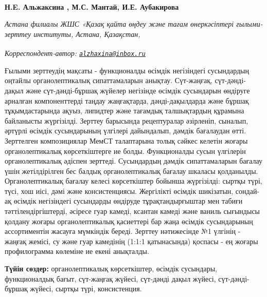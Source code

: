 
\begin{articleheader}

{\bfseries Н.E. Альжаксина\textsuperscript{\envelope } ,
М.С. Мантай,
И.Е. Аубакирова}
\end{articleheader}

\begin{affiliation}
\emph{Астана филиалы ЖШС «Қазақ қайта өңдеу және тағам өнеркәсіптері ғылыми-зерттеу институты, Астана, Қазақстан,}

\raggedright \textsuperscript{\envelope }{\em Корреспондент-автор: \href{mailto:alzhaxina@inbox.ru}{\nolinkurl{alzhaxina@inbox.ru}}}
\end{affiliation}

Ғылыми зерттеудің мақсаты - функционалды өсімдік негізіндегі сусындардың
оңтайлы органолептикалық сипаттамаларын анықтау. Сүт-жаңғақ,
сүт-дәнді-дақыл және сүт-дәнді-бұршақ жүйелер негізінде өсімдік
сусындарын өндіруге арналған компоненттерді таңдау жаңғақтарда,
дәнді-дақылдарда және бұршақ тұқымдастарында ақуыз, липидтер және
тағамдық талшықтардың құрамына байланысты жүргізілді. Зерттеу барысында
рецептуралар әзірленіп, сыналып, әртүрлі өсімдік сусындарының үлгілері
дайындалып, дәмдік бағалаудан өтті. Зерттелген композициялар МемСТ
талаптарына толық сәйкес келетін жоғары органолептикалық көрсеткіштерге
ие болды. Функционалды сусын үлгілерін органолептикалық әдіспен
зерттеді. Сусындардың дәмдік сипаттамаларын бағалау үшін жетілдірілген
бес балдық органолептикалық бағалау шкаласы қолданылды. Органолептикалық
бағалау келесі көрсеткіштер бойынша жүргізілді: сыртқы түрі, түсі, хош
иісі, дәмі және консистенциясы. Жергілікті өсімдік шикізатын, сондай-ақ
өсімдік негізіндегі сусындарды өндіруде тұрақтандырғыштар мен табиғи
тәттілендіргіштерді, әсіресе гуар камеді, ксантан камеді және ваниль
сығындысы қолдану жоғары органолептикалық қасиеттері бар жаңа өсімдік
сусындарының ассортиментін жасауға мүмкіндік береді. Зерттеу нәтижесінде
№1 үлгінің - жаңғақ жемісі, су және гуар камедінің (1:1:1 қатынасында)
қоспасы - ең жоғары профилограмма көлеміне ие екені анықталды.

{\bfseries Түйін сөздер:} органолептикалық көрсеткіштер, өсімдік сусындары,
функционалдық бағыт, сүт-жаңғақ жүйесі, сүт-дәнді дақыл жүйесі,
сүт-дәнді-бұршақ жүйесі, сыртқы түрі, консистенция.

